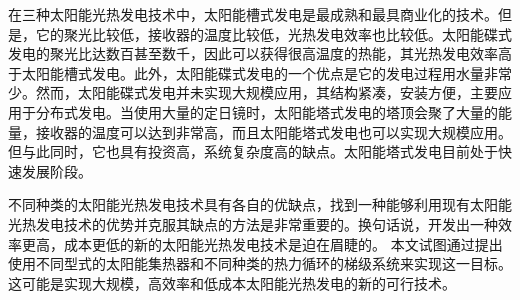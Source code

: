 在三种太阳能光热发电技术中，太阳能槽式发电是最成熟和最具商业化的技术。但是，它的聚光比较低，接收器的温度比较低，光热发电效率也比较低。太阳能碟式发电的聚光比达数百甚至数千，因此可以获得很高温度的热能，其光热发电效率高于太阳能槽式发电。此外，太阳能碟式发电的一个优点是它的发电过程用水量非常少。然而，太阳能碟式发电并未实现大规模应用，其结构紧凑，安装方便，主要应用于分布式发电。当使用大量的定日镜时，太阳能塔式发电的塔顶会聚了大量的能量，接收器的温度可以达到非常高，而且太阳能塔式发电也可以实现大规模应用。但与此同时，它也具有投资高，系统复杂度高的缺点。太阳能塔式发电目前处于快速发展阶段。

不同种类的太阳能光热发电技术具有各自的优缺点，找到一种能够利用现有太阳能光热发电技术的优势并克服其缺点的方法是非常重要的。换句话说，开发出一种效率更高，成本更低的新的太阳能光热发电技术是迫在眉睫的。
本文试图通过提出使用不同型式的太阳能集热器和不同种类的热力循环的梯级系统来实现这一目标。这可能是实现大规模，高效率和低成本太阳能光热发电的新的可行技术。

